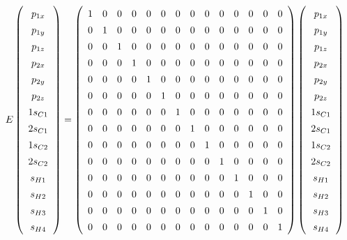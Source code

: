 \documentclass[9pt]{report}
\begin{document}
\scriptsize
\begin{equation}
E
\renewcommand{\arraystretch}{1.4}
\left(\begin{array}{c} p_{1x}  \\  p_{1y}  \\  p_{1z}  \\  p_{2x}  \\ p_{2y} \\  p_{2z}  \\  1s_{C1}  \\  2s_{C1}  \\  1s_{C2}  \\  2s_{C2}  \\  s_{H1}  \\  s_{H2}  \\  s_{H3}  \\  s_{H4}   \\\end{array}\right)
=
\left(\begin{array}{cccccccccccccc}
1 & 0 & 0 & 0 & 0 & 0 & 0 & 0 & 0 & 0 & 0 & 0 & 0 & 0
\\
0 & 1 & 0 & 0 & 0 & 0 & 0 & 0 & 0 & 0 & 0 & 0 & 0 & 0
\\
0 & 0 & 1 & 0 & 0 & 0 & 0 & 0 & 0 & 0 & 0 & 0 & 0 & 0
\\
0 & 0 & 0 & 1 & 0 & 0 & 0 & 0 & 0 & 0 & 0 & 0 & 0 & 0
\\
0 & 0 & 0 & 0 & 1 & 0 & 0 & 0 & 0 & 0 & 0 & 0 & 0 & 0
\\
0 & 0 & 0 & 0 & 0 & 1 & 0 & 0 & 0 & 0 & 0 & 0 & 0 & 0
\\
0 & 0 & 0 & 0 & 0 & 0 & 1 & 0 & 0 & 0 & 0 & 0 & 0 & 0
\\
0 & 0 & 0 & 0 & 0 & 0 & 0 & 1 & 0 & 0 & 0 & 0 & 0 & 0
\\
0 & 0 & 0 & 0 & 0 & 0 & 0 & 0 & 1 & 0 & 0 & 0 & 0 & 0
\\
0 & 0 & 0 & 0 & 0 & 0 & 0 & 0 & 0 & 1 & 0 & 0 & 0 & 0
\\
0 & 0 & 0 & 0 & 0 & 0 & 0 & 0 & 0 & 0 & 1 & 0 & 0 & 0
\\
0 & 0 & 0 & 0 & 0 & 0 & 0 & 0 & 0 & 0 & 0 & 1 & 0 & 0
\\
0 & 0 & 0 & 0 & 0 & 0 & 0 & 0 & 0 & 0 & 0 & 0 & 1 & 0
\\
0 & 0 & 0 & 0 & 0 & 0 & 0 & 0 & 0 & 0 & 0 & 0 & 0 & 1
\\\end{array}\right)
\left(\begin{array}{c} p_{1x}  \\  p_{1y}  \\  p_{1z}  \\  p_{2x}  \\ p_{2y} \\  p_{2z}  \\  1s_{C1}  \\  2s_{C1}  \\  1s_{C2}  \\  2s_{C2}  \\  s_{H1}  \\  s_{H2}  \\  s_{H3}  \\  s_{H4}   \\\end{array}\right)
\end{equation}
\end{document}
